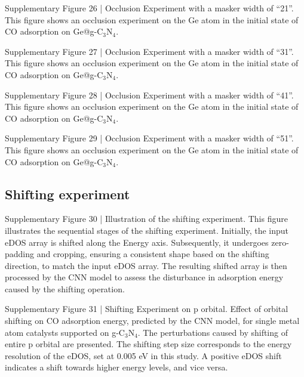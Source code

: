Supplementary Figure 26 | Occlusion Experiment with a masker width of “21”. This figure shows an occlusion experiment on the Ge atom in the initial state of CO adsorption on Ge@g-C$_3$N$_4$.

Supplementary Figure 27 | Occlusion Experiment with a masker width of “31”. This figure shows an occlusion experiment on the Ge atom in the initial state of CO adsorption on Ge@g-C$_3$N$_4$.


Supplementary Figure 28 | Occlusion Experiment with a masker width of “41”. This figure shows an occlusion experiment on the Ge atom in the initial state of CO adsorption on Ge@g-C$_3$N$_4$.

Supplementary Figure 29 | Occlusion Experiment with a masker width of “51”. This figure shows an occlusion experiment on the Ge atom in the initial state of CO adsorption on Ge@g-C$_3$N$_4$.


\subsection{Shifting experiment}

Supplementary Figure 30 | Illustration of the shifting experiment. This figure illustrates the sequential stages of the shifting experiment. Initially, the input eDOS array is shifted along the Energy axis. Subsequently, it undergoes zero-padding and cropping, ensuring a consistent shape based on the shifting direction, to match the input eDOS array. The resulting shifted array is then processed by the CNN model to assess the disturbance in adsorption energy caused by the shifting operation.


Supplementary Figure 31 | Shifting Experiment on p orbital. Effect of orbital shifting on CO adsorption energy, predicted by the CNN model, for single metal atom catalysts supported on g-C$_3$N$_4$. The perturbations caused by shifting of entire p orbital are presented. The shifting step size corresponds to the energy resolution of the eDOS, set at 0.005 eV in this study. A positive eDOS shift indicates a shift towards higher energy levels, and vice versa.
